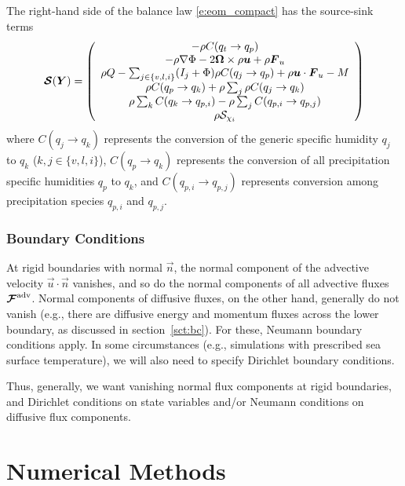 \documentclass{report}
\begin{document}
{The right-hand side of the balance law \eqref{e:eom_compact} has the source-sink terms
\begin{multline}
\boldsymbol{{\mathcal{S}}}(\boldsymbol{{Y}})= 
 \left( \begin{array}{c}
 -\rho C(q_t \rightarrow q_p) \\
  -\rho \nabla\Phi - 2 \boldsymbol{{\Omega}} \times \rho\boldsymbol{{u}}  + \rho \boldsymbol{{F}}_u \\
 \rho Q - \sum_{j\in\{v,l,i\}} (I_j + \Phi)  \rho C(q_j \rightarrow q_p) + \rho \boldsymbol{{u}} \cdot \boldsymbol{{F}}_u - M \\
\rho C(q_p \rightarrow q_k) + \rho \sum_j \rho C(q_j \rightarrow q_k) \\
\rho \sum_k C(q_k \rightarrow q_{p, i}) - \rho \sum_j C(q_{p, i} \rightarrow q_{p, j})\\
\rho \mathcal{S}_{\chi_i}
\end{array}
\right)
\label{eq:source}
\end{multline}
where $C(q_j \rightarrow q_k)$ represents the conversion of the generic specific humidity $q_j$ to $q_k$ ($k, j \in \{v, l, i\}$), $C(q_p \rightarrow q_k)$ represents the conversion of all precipitation specific humidities $q_p$ to $q_k$, and $C(q_{p, i} \rightarrow q_{p, j})$ represents conversion among precipitation species $q_{p, i}$ and $q_{p, j}$. 

\subsection{Boundary Conditions}

At rigid boundaries with normal $\vec{n}$, the normal component of the advective velocity $\vec{u} \cdot \vec{n}$ vanishes, and so do the normal components of all advective fluxes $\boldsymbol{{\mathcal{F}}}^{\mathrm{adv}}$. Normal components of diffusive fluxes, on the other hand, generally do not vanish (e.g., there are diffusive energy and momentum fluxes across the lower boundary, as discussed in section~\ref{sct:bc}). For these, Neumann boundary conditions apply. In some circumstances (e.g., simulations with prescribed sea surface temperature), we will also need to specify Dirichlet boundary conditions. 

Thus, generally, we want vanishing normal flux components at rigid boundaries, and Dirichlet conditions on state variables and/or Neumann conditions on diffusive flux components.

\chapter{Numerical Methods}\label{sec:numerical_methods}

}
\end{document}
